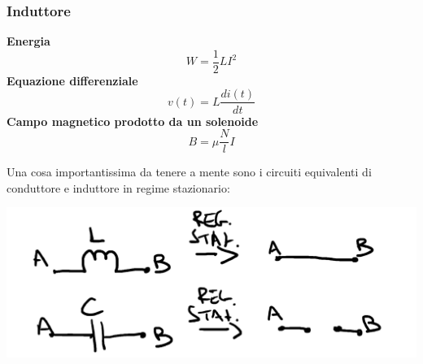\documentclass{article}
\begin{document}
\subsubsection{Induttore}
\textbf{Energia}
\[
    W = \frac{1}{2}LI^2
\]
\textbf{Equazione differenziale}
\[
    v(t) = L \frac{di(t)}{dt}
\]
\textbf{Campo magnetico prodotto da un solenoide}
\[
    B = \mu  \frac{N}{l}  I
\]

Una cosa importantissima da tenere a mente sono i circuiti equivalenti di conduttore e induttore in regime stazionario:
\begin{center}
    \includegraphics[scale=0.2]{Image/Es_4_Trans_1.png}
\end{center}
\end{document}
